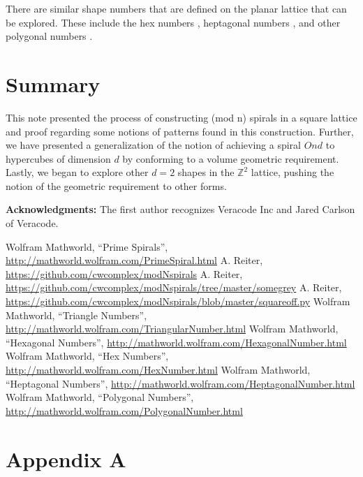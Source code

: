\documentclass[11pt,reqno]{amsart}
\theoremstyle{mydef}
\begin{document}
There are similar shape numbers that are defined on the planar lattice that can be explored. These include the 
hex numbers \cite{HexNum}, heptagonal numbers \cite{Hepta}, and other polygonal numbers \cite{Polyg}.

\section{Summary}
This note presented the process of constructing (mod n) spirals in a square lattice and proof regarding some 
notions of patterns found in this construction. Further, we have presented a generalization of the notion of
achieving a spiral $Ond$ to hypercubes of dimension $d$ by conforming to a volume geometric requirement.
Lastly, we began to explore other $d = 2$ shapes in the $\mathbb{Z}^2$ lattice, pushing the notion of the 
geometric requirement to other forms. 

\vspace{12pt}\noindent\textbf{Acknowledgments:}\quad
The first author recognizes Veracode Inc and Jared Carlson of Veracode.

\begin{thebibliography}{1}
 Wolfram Mathworld, ``Prime Spirals'',
  \url{http://mathworld.wolfram.com/PrimeSpiral.html}
 A. Reiter,
  \url{https://github.com/cwcomplex/modNspirals}
 A. Reiter,
  \url{https://github.com/cwcomplex/modNspirals/tree/master/somegrey}
 A. Reiter,
  \url{https://github.com/cwcomplex/modNspirals/blob/master/squareoff.py}
 Wolfram Mathworld, ``Triangle Numbers'',
  \url{http://mathworld.wolfram.com/TriangularNumber.html}
 Wolfram Mathworld, ``Hexagonal Numbers'',
  \url{http://mathworld.wolfram.com/HexagonalNumber.html}
 Wolfram Mathworld, ``Hex Numbers'',
  \url{http://mathworld.wolfram.com/HexNumber.html}
 Wolfram Mathworld, ``Heptagonal Numbers'',
  \url{http://mathworld.wolfram.com/HeptagonalNumber.html}
 Wolfram Mathworld, ``Polygonal Numbers'',
  \url{http://mathworld.wolfram.com/PolygonalNumber.html}
\end{thebibliography}



\clearpage
\section{Appendix A}
\end{document}
